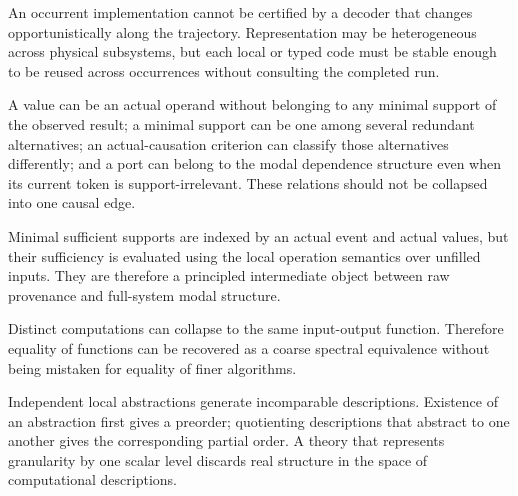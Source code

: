 \documentclass[11pt,a4paper]{article}
\begin{document}
\begin{consequencebox}[title={2. Value identity requires a coherent representation scheme}]
An occurrent implementation cannot be certified by a decoder that changes opportunistically along the trajectory. Representation may be heterogeneous across physical subsystems, but each local or typed code must be stable enough to be reused across occurrences without consulting the completed run.
\end{consequencebox}

\begin{consequencebox}[title={3. Participation, support, contribution, and modal dependence are different}]
A value can be an actual operand without belonging to any minimal support of the observed result; a minimal support can be one among several redundant alternatives; an actual-causation criterion can classify those alternatives differently; and a port can belong to the modal dependence structure even when its current token is support-irrelevant. These relations should not be collapsed into one causal edge.
\end{consequencebox}

\begin{consequencebox}[title={4. Value support is intermediate rather than purely occurrent}]
Minimal sufficient supports are indexed by an actual event and actual values, but their sufficiency is evaluated using the local operation semantics over unfilled inputs. They are therefore a principled intermediate object between raw provenance and full-system modal structure.
\end{consequencebox}

\begin{consequencebox}[title={5. Function identity is a quotient, not full identity}]
Distinct computations can collapse to the same input-output function. Therefore equality of functions can be recovered as a coarse spectral equivalence without being mistaken for equality of finer algorithms.
\end{consequencebox}

\begin{consequencebox}[title={6. Abstraction is generally only partially ordered}]
Independent local abstractions generate incomparable descriptions. Existence of an abstraction first gives a preorder; quotienting descriptions that abstract to one another gives the corresponding partial order. A theory that represents granularity by one scalar level discards real structure in the space of computational descriptions.
\end{consequencebox}
\end{document}
